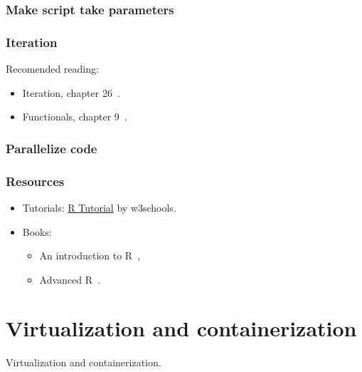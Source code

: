 \documentclass[aspectratio=169]{beamer}
\begin{document}
\begin{frame}
    \frametitle{Make script take parameters}
\end{frame}

\begin{frame}
    \frametitle{Iteration}
    Recomended reading:
    \begin{itemize}
        \item Iteration, chapter 26~\cite{wickham2023a}.
        \item Functionals, chapter 9~\cite{wickham2019}.
    \end{itemize}
\end{frame}

\begin{frame}
    \frametitle{Parallelize code}
\end{frame}

\begin{frame}
    \frametitle{Resources}
    \begin{itemize}
        \item Tutorials: \href{https://www.w3schools.com/r/default.asp}
            {R Tutorial} by w3schools.
        \item Books: 
            \begin{itemize}
                \item An introduction to R~\cite{venables2024},
                \item Advanced R~\cite{wickham2015a}.
            \end{itemize}
    \end{itemize}
\end{frame}






\section{Virtualization and containerization}



\begin{frame}
    Virtualization and containerization.
\end{frame}
\end{document}
